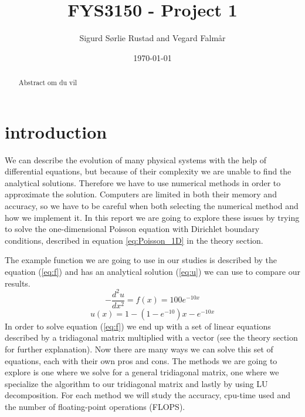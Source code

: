 \documentclass[reprint, english,notitlepage]{revtex4-1}  %
\begin{document}
\title{FYS3150 - Project 1}
\date{\today}
\author{Sigurd Sørlie Rustad and Vegard Falmår}


\newpage

\begin{abstract}
Abstract om du vil
\end{abstract}
\maketitle                                %

\section{introduction}

We can describe the evolution of many physical systems with the help of differential equations, but because of their complexity we  are unable to find the analytical solutions. Therefore we have to use numerical methods in order to approximate the solution. Computers are limited in both their memory and accuracy, so we have to be careful when both selecting the numerical method and how we implement it. In this report we are going to explore these issues by trying to solve the one-dimensional Poisson equation with Dirichlet boundary conditions, described in equation \ref{eq:Poisson_1D} in the theory section.

The example function we are going to use in our studies is described by the equation (\ref{eq:f}) and has an analytical solution (\ref{eq:u}) we can use to compare our results.
\begin{equation}
	-\frac{d^2u}{dx^2} = f(x) = 100e^{-10x}
	\label{eq:f}
\end{equation}
\begin{equation}
	u(x) = 1 - (1 - e^{-10})x - e^{-10x}
	\label{eq:u}
\end{equation}
In order to solve equation (\ref{eq:f}) we end up with a set of linear equations described by a tridiagonal matrix multiplied with a vector (see the theory section for further explanation). Now there are many ways we can solve this set of equations, each with their own pros and cons. The methods we are going to explore is one where we solve for a general tridiagonal matrix, one where we specialize the algorithm to our tridiagonal matrix and lastly by using LU decomposition. For each method we will study the accuracy, cpu-time used and the number of floating-point operations (FLOPS).
\end{document}
